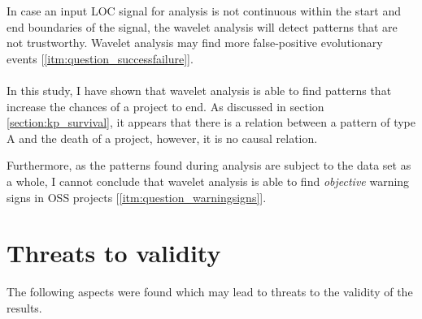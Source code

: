 In case an input LOC signal for analysis is not continuous within the start
and end boundaries of the signal, the wavelet analysis will detect patterns
that are not trustworthy. Wavelet analysis may find more false-positive
evolutionary events [\ref{itm:question_successfailure}].

\paragraph{}
In this study, I have shown that wavelet analysis is able to find patterns that
increase the chances of a project to end. As discussed in section
\ref{section:kp_survival}, it appears that there is a relation between a
pattern of type A and the death of a project, however, it is no causal
relation.

Furthermore, as the patterns found during analysis are subject to the data set
as a whole, I cannot conclude that wavelet analysis is able to find
\emph{objective }\rm warning signs in OSS projects
[\ref{itm:question_warningsigns}].

\section{Threats to validity}
The following aspects were found which may lead to threats to the validity of
the results.

